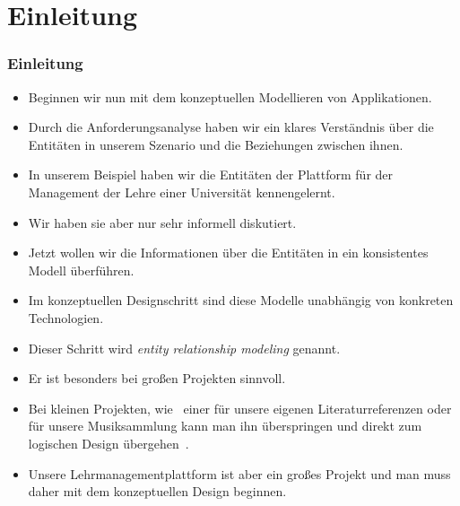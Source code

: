 \documentclass[aspectratio=169,mathserif,notheorems]{beamer}%
\subtitle{27.~Konzeptuelles Schema:~Entitäten und Attribute}%
\begin{document}
%
%
\startPresentation%
%
\section{Einleitung}%
%
\begin{frame}%
\frametitle{Einleitung}%
\begin{itemize}%
\item Beginnen wir nun mit dem konzeptuellen Modellieren von Applikationen.%
%
\item<2-> Durch die Anforderungsanalyse haben wir ein klares Verständnis über die Entitäten in unserem Szenario und die Beziehungen zwischen ihnen.%
%
\item<3-> In unserem Beispiel haben wir die Entitäten der Plattform für der Management der Lehre einer Universität kennengelernt.%
%
\item<4-> Wir haben sie aber nur sehr informell diskutiert.%
%
\item<5-> Jetzt wollen wir die Informationen über die Entitäten in ein konsistentes Modell überführen.%
%
\item<6-> Im konzeptuellen Designschritt sind diese Modelle unabhängig von konkreten Technologien.%
%
\item<7-> Dieser Schritt wird \emph{entity relationship modeling} genannt\cite{G2011EW2ITDS:CMUTERM,SS2005EIDDDFDB:CDDRAAML,SS2005EIDDDFDB:CDDICAMP,V1999C5DMS:CDUTERM,B1990CMERMO}.%
%
\item<8-> Er ist besonders bei großen Projekten sinnvoll.%
%
\item<9-> Bei kleinen Projekten, wie \DEzB\ einer  für unsere eigenen Literaturreferenzen oder für unsere Musiksammlung kann man ihn überspringen und direkt zum logischen Design übergehen~\cite{S2024D:CDMERDE}.%
%
\item<10-> Unsere Lehrmanagementplattform ist aber ein großes Projekt und man muss daher mit dem konzeptuellen Design beginnen.%
\end{itemize}%
\end{frame}%
%
\end{document}
